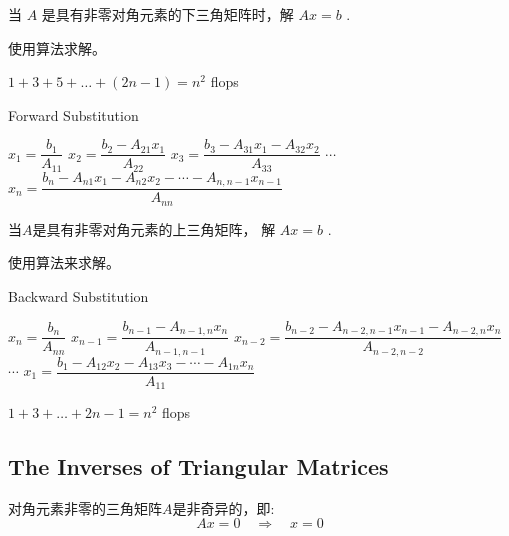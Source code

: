 \begin{problem}
    当 $ A $ 是具有非零对角元素的下三角矩阵时，解 $ A x=b $ .
\end{problem}

使用算法求解。

\begin{theorem}[前向回代时间复杂度]
    \label{complexity:forward-substitution}
    $ 1+3+5+\ldots+(2  {n}-1)= {n}^{2} $ flops
\end{theorem}

\begin{algorithm}[htbp]
    \caption{Forward Substitution}
    $ x_{1}= \dfrac{b_{1} }{A_{11} }  $\;
$ x_{2}=\dfrac{b_{2}-A_{21} x_{1}}{A_{22}}$\;
$  x_{3} =\dfrac{b_{3}-A_{31} x_{1}-A_{32} x_{2}}{A_{33}} $ \;
    $\cdots$  \;
    $x_{n} =
    \dfrac{b_{n}-A_{n 1} x_{1}-A_{n 2} x_{2}-\cdots-A_{n, n-1} x_{n-1}}{A_{n n}} $\;
\end{algorithm}

\begin{problem}
    当$A$是具有非零对角元素的上三角矩阵， 解 $  {A} x= {b} $ .
\end{problem}

使用算法来求解。

\begin{algorithm}[htbp]
    \caption{Backward Substitution}
    $ x_{n}= \dfrac{b_{n}}{A_{n n}} $\;
    $ x_{n-1}= \dfrac{b_{n-1}-A_{n-1, n} x_{n}}{A_{n-1, n-1}} $ \;
    $ x_{n-2}= \dfrac{b_{n-2}-A_{n-2, n-1} x_{n-1}-A_{n-2, n} x_{n}}{ A_{n-2, n-2}} $\;
    $\cdots$\;
    $ x_{1}=\dfrac{b_{1}-A_{12} x_{2}-A_{13} x_{3}-\cdots-A_{1 n} x_{n}}{A_{11}}  $\;
\end{algorithm}

\begin{theorem}[后向回代时间复杂度]
    $ 1+3+\ldots+2  {n}-1= {n}^{2} $ flops
\label{complexity:Backward-Substitution}
\end{theorem}



\subsection{The Inverses of Triangular Matrices}

\begin{theorem}
    对角元素非零的三角矩阵$A$是非奇异的，即:
\begin{equation}
A x=0 \quad \Rightarrow \quad x=0
\end{equation}
\end{theorem}

